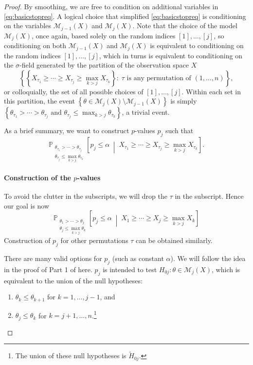 \documentclass[11pt]{article}
\theoremstyle{definition}
\theoremstyle{custom}
\newcommand{\PP}{\mathbb{P}}
\begin{document}
\begin{proof}
By smoothing, we are free to condition on additional variables in \eqref{eq:basicstopreq}. A logical choice that simplified \eqref{eq:basicstopreq} is conditioning on the variables $\mathcal{M}_{j-1}\left(X\right)$ and $\mathcal{M}_j\left(X\right)$. Note that the choice of the model $\mathcal{M}_j\left(X\right)$, once again, based solely on the random indices $[1], \ldots, [j]$, so conditioning on both $\mathcal{M}_{j-1}\left(X\right)$ and $\mathcal{M}_j\left(X\right)$ is equivalent to conditioning on the random indices $[1], \ldots, [j]$, which in turns is equivalent to conditioning on the $\sigma$-field generated by the partition of the observation space $X$
\[\left\{\left\{X_{\tau_1} \ge \cdots \ge X_{\tau_j} \ge \max_{k>j} X_{\tau_k}\right\}:\; \tau \text{ is any permutation of } \left(1, \ldots, n\right)\right\},\]
or colloquially, the set of all possible choices of $[1], \ldots, [j]$. Within each set in this partition, the event $\left\{\theta \in \mathcal{M}_j\left(X\right) \setminus \mathcal{M}_{j-1}\left(X\right)\right\}$ is simply $\left\{\theta_{\tau_1} > \cdots > \theta_{\tau_j} \text { and } \theta_{\tau_j} \le \max_{k>j} \theta_{\tau_k}\right\}$, a trivial event.

As a brief summary, we want to construct $p$-values $p_j$ such that
\[\PP_{\substack{\theta_{\tau_1} > \cdots > \theta_{\tau_j} \\ \theta_{\tau_j} \le \max_{k>j} \theta_{\tau_k}}} \left[p_j \le \alpha \;\middle|\; X_{\tau_1} \ge \cdots \ge X_{\tau_j} \ge \max_{k>j} X_{\tau_k}\right].\]

\paragraph{Construction of the $p$-values}

To avoid the clutter in the subscripts, we will drop the $\tau$ in the subscript. Hence our goal is now
\[\PP_{\substack{\theta_1 > \cdots > \theta_j \\ \theta_j \le \max_{k>j} \theta_k}} \left[p_j \le \alpha \;\middle|\; X_1 \ge \cdots \ge X_j \ge \max_{k>j} X_k\right]\]
Construction of $p_j$ for other permutations $\tau$ can be obtained similarly.

There are many valid options for $p_j$ (such as constant $\alpha$). We will follow the idea in the proof of Part 1 of  here. $p_j$ is intended to test $H_{0j}: \theta \in \mathcal{M}_j\left(X\right)$, which is equivalent to the union of the null hypotheses:
\begin{enumerate}
\item $\theta_k \le \theta_{k+1}$ for $k = 1, \ldots, j-1$, and
\item $\theta_j \le \theta_k$ for $k = j+1, \ldots, n$.\footnote{The union of these null hypotheses is $\widetilde{H}_{0j}$.}
\end{enumerate}


\end{proof}
\end{document}
